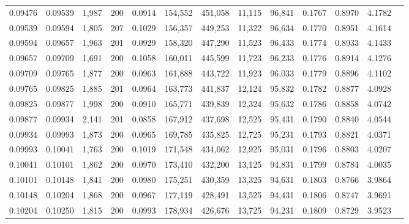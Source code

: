 \begin{tabular}{rrrrrrrrrrrrr}
0.09476 & 0.09539 & 1,987 & 200 &                                     0.0914 & 154,552 & 451,058 &  11,115 &  96,841 & 0.1767 & 0.8970 & 4.1782 \\
0.09539 & 0.09594 & 1,805 & 207 &                                     0.1029 & 156,357 & 449,253 &  11,322 &  96,634 & 0.1770 & 0.8951 & 4.1614 \\
0.09594 & 0.09657 & 1,963 & 201 &                                     0.0929 & 158,320 & 447,290 &  11,523 &  96,433 & 0.1774 & 0.8933 & 4.1433 \\
0.09657 & 0.09709 & 1,691 & 200 &                                     0.1058 & 160,011 & 445,599 &  11,723 &  96,233 & 0.1776 & 0.8914 & 4.1276 \\
0.09709 & 0.09765 & 1,877 & 200 &                                     0.0963 & 161,888 & 443,722 &  11,923 &  96,033 & 0.1779 & 0.8896 & 4.1102 \\
0.09765 & 0.09825 & 1,885 & 201 &                                     0.0964 & 163,773 & 441,837 &  12,124 &  95,832 & 0.1782 & 0.8877 & 4.0928 \\
0.09825 & 0.09877 & 1,998 & 200 &                                     0.0910 & 165,771 & 439,839 &  12,324 &  95,632 & 0.1786 & 0.8858 & 4.0742 \\
0.09877 & 0.09934 & 2,141 & 201 &                                     0.0858 & 167,912 & 437,698 &  12,525 &  95,431 & 0.1790 & 0.8840 & 4.0544 \\
0.09934 & 0.09993 & 1,873 & 200 &                                     0.0965 & 169,785 & 435,825 &  12,725 &  95,231 & 0.1793 & 0.8821 & 4.0371 \\
0.09993 & 0.10041 & 1,763 & 200 &                                     0.1019 & 171,548 & 434,062 &  12,925 &  95,031 & 0.1796 & 0.8803 & 4.0207 \\
0.10041 & 0.10101 & 1,862 & 200 &                                     0.0970 & 173,410 & 432,200 &  13,125 &  94,831 & 0.1799 & 0.8784 & 4.0035 \\
0.10101 & 0.10148 & 1,841 & 200 &                                     0.0980 & 175,251 & 430,359 &  13,325 &  94,631 & 0.1803 & 0.8766 & 3.9864 \\
0.10148 & 0.10204 & 1,868 & 200 &                                     0.0967 & 177,119 & 428,491 &  13,525 &  94,431 & 0.1806 & 0.8747 & 3.9691 \\
0.10204 & 0.10250 & 1,815 & 200 &                                     0.0993 & 178,934 & 426,676 &  13,725 &  94,231 & 0.1809 & 0.8729 & 3.9523 \\

\end{tabular}
